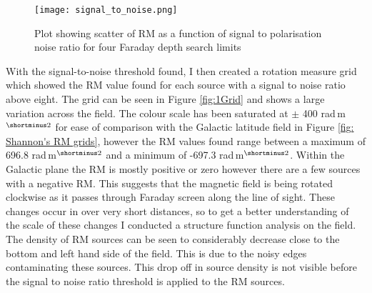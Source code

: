 \begin{figure}
    \centering
    \texttt{[image: signal\_to\_noise.png]}

        \caption[Rotation Measure scatter]{Plot showing scatter of RM as a function of signal to polarisation noise ratio for four Faraday depth search limits}
    \label{fig: s/n}
\end{figure}

With the signal-to-noise threshold found, I then created a rotation measure grid which showed the RM value found for each source with a signal to noise ratio above eight. The grid can be seen in Figure \ref{fig:1Grid} and shows a large variation across the field. The colour scale has been saturated at $\pm$ 400 rad$\,$m$^{\shortminus2}$ for ease of comparison with the Galactic latitude field in Figure \ref{fig: Shannon's RM grids}, however the RM values found range between a maximum of 696.8 rad$\,$m$^{\shortminus2}$ and a minimum of -697.3 rad$\,$m$^{\shortminus2}$. Within the Galactic plane the RM is mostly positive or zero however there are a few sources with a negative RM. This suggests that the magnetic field is being rotated clockwise as it passes through Faraday screen along the line of sight. These changes occur in over very short distances, so to get a better understanding of the scale of these changes I conducted a structure function analysis on the field. The density of RM sources can be seen to considerably decrease close to the bottom and left hand side of the field. This is due to the noisy edges contaminating these sources. This drop off in source density is not visible before the signal to noise ratio threshold is applied to the RM sources.



